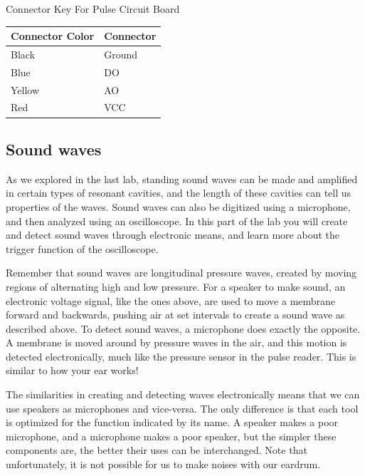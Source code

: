 \begin{center}
Connector Key For Pulse Circuit Board\\
\begin{tabular}{ |l | l | } \hline
  \textbf{Connector Color} & \textbf{Connector} \\ \hline
  Black & Ground \\ \hline
  Blue & DO \\ \hline
  Yellow & AO \\ \hline
  Red & VCC \\ \hline
\end{tabular}
\end{center}

\subsection{Sound waves}

As we explored in the last lab, standing sound waves can be made and amplified in certain types of resonant cavities, and the length of these cavities can tell us properties of the waves. Sound waves can also be digitized using a microphone, and then analyzed using an oscilloscope. In this part of the lab you will create and detect sound waves through electronic means, and learn more about the trigger function of the oscilloscope.

Remember that sound waves are longitudinal pressure waves, created by moving regions of alternating high and low pressure. For a speaker to make sound, an electronic voltage signal, like the ones above, are used to move a membrane forward and backwards, pushing air at set intervals to create a sound wave as described above. To detect sound waves, a microphone does exactly the opposite. A membrane is moved around by pressure waves in the air, and this motion is detected electronically, much like the pressure sensor in the pulse reader. This is similar to how your ear works! 

The similarities in creating and detecting waves electronically means that we can use speakers as microphones and vice-versa. The only difference is that each tool is optimized for the function indicated by its name. A speaker makes a poor microphone, and a microphone makes a poor speaker, but the simpler these components are, the better their uses can be interchanged. Note that unfortunately, it is not possible for us to make noises with our eardrum.


